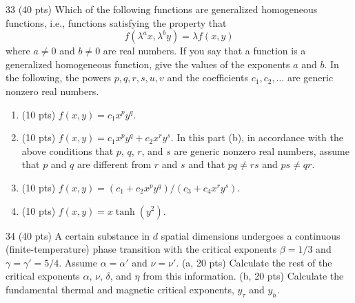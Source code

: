 \begin{hwproblem}{3}{3}
(40 pts) Which of the following functions are generalized homogeneous functions, i.e., functions satisfying the
property that
\begin{equation}
  f(\lambda^ax,\lambda^by) = \lambda f(x,y)
\end{equation}
where $a\ne 0$ and $b\ne 0$ are real numbers. If you say that a function is a generalized homogeneous function, give
the values of the exponents $a$ and $b$. In the following, the powers $p,q,r,s,u,v$ and the coefficients
$c_1,c_2,\ldots$ are generic nonzero real numbers.
\begin{enumerate}[label=(\alph*),nosep,leftmargin=*]
  \item (10 pts) $f(x,y) = c_1x^py^q$.
  \item (10 pts) $f(x,y) = c_1x^py^q+c_2x^ry^s$. In this part (b), in accordance with the above conditions that $p$,
    $q$, $r$, and $s$ are generic nonzero real numbers, assume that $p$ and $q$ are different from $r$ and $s$ and that
    $pq\ne rs$ and $ps\ne qr$.
  \item (10 pts) $f(x,y) = (c_1+c_2x^py^q)/(c_3+c_4x^ry^s)$.
  \item (10 pts) $f(x,y) = x\tanh(y^2)$.
\end{enumerate}
\end{hwproblem}

\begin{hwproblem}{3}{4}
(40 pts) A certain substance in $d$ spatial dimensions undergoes a continuous (finite-temperature) phase transition
with the critical exponents $\beta = 1/3$ and $\gamma = \gamma' = 5/4$. Assume $\alpha = \alpha'$ and $\nu = \nu'$.
(a, 20 pts) Calculate the rest of the critical exponents $\alpha$, $\nu$, $\delta$, and $\eta$ from this information.
(b, 20 pts) Calculate the fundamental thermal and magnetic critical exponents, $y_\tau$ and $y_h$.
\end{hwproblem}

